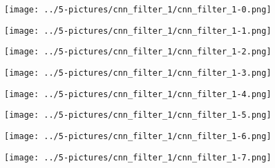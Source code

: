 \documentclass[11pt]{beamer}
\begin{document}
\begin{frame}
	\begin{center}
	\texttt{[image: ../5-pictures/cnn\_filter\_1/cnn\_filter\_1-0.png]}
	\end{center}
\end{frame}
\begin{frame}
	\begin{center}
	\texttt{[image: ../5-pictures/cnn\_filter\_1/cnn\_filter\_1-1.png]}
	\end{center}
\end{frame}
\begin{frame}
	\begin{center}
	\texttt{[image: ../5-pictures/cnn\_filter\_1/cnn\_filter\_1-2.png]}
	\end{center}
\end{frame}
\begin{frame}
	\begin{center}
	\texttt{[image: ../5-pictures/cnn\_filter\_1/cnn\_filter\_1-3.png]}
	\end{center}
\end{frame}
\begin{frame}
	\begin{center}
	\texttt{[image: ../5-pictures/cnn\_filter\_1/cnn\_filter\_1-4.png]}
	\end{center}
\end{frame}
\begin{frame}
	\begin{center}
	\texttt{[image: ../5-pictures/cnn\_filter\_1/cnn\_filter\_1-5.png]}
	\end{center}
\end{frame}
\begin{frame}
	\begin{center}
	\texttt{[image: ../5-pictures/cnn\_filter\_1/cnn\_filter\_1-6.png]}
	\end{center}
\end{frame}
\begin{frame}
	\begin{center}
	\texttt{[image: ../5-pictures/cnn\_filter\_1/cnn\_filter\_1-7.png]}
	\end{center}
\end{frame}
\end{document}
